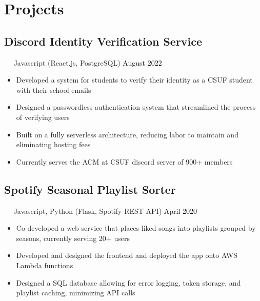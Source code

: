 \documentclass{article}
\newcommand{\resumesection}[3]{
    \subsection*{#1}
    \ 
    \ 
    \small
    \textcolor{csufgrey}{#2}
    \normalsize
    \hfill
    \textcolor{black}{#3}
    \normalsize
}
\begin{document}
\section*{Projects}
\resumesection{Discord Identity Verification Service}{Javascript (React.js, PostgreSQL)}{August 2022}
\begin{itemize}
    \item Developed a system for students to verify their identity as a CSUF student with their school emails
    \item Designed a passwordless authentication system that streamlined the process of verifying users
    \item Built on a fully serverless architecture, reducing labor to maintain and eliminating hosting fees
    \item Currently serves the ACM at CSUF discord server of 900+ members
\end{itemize}

\resumesection{Spotify Seasonal Playlist Sorter}{Javascript, Python (Flask, Spotify REST API)}{April 2020}
\begin{itemize}
    \item Co-developed a web service that places liked songs into playlists grouped by seasons, currently serving 20+ users
    \item Developed and designed the frontend and deployed the app onto AWS Lambda functions
    \item Designed a SQL database allowing for error logging, token storage, and playlist caching, minimizing API calls
\end{itemize}

\end{document}
